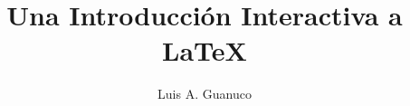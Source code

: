 \newenvironment{exampletwoup}
  {\VerbatimEnvironment
   \begin{VerbatimOut}{example.out}}
  {\end{VerbatimOut}
   \setlength{\parindent}{0pt}
   \fbox{\begin{tabular}{l|l}
   \begin{minipage}{0.55\linewidth}
     \inputminted[fontsize=\small,resetmargins]{latex}{example.out}
   \end{minipage} &
   \begin{minipage}{0.35\linewidth}
     
   \end{minipage}
   \end{tabular}}}

\newenvironment{exampletwouptiny}
  {\VerbatimEnvironment
   \begin{VerbatimOut}{example.out}}
  {\end{VerbatimOut}
   \setlength{\parindent}{0pt}
   \fbox{\begin{tabular}{l|l}
   \begin{minipage}{0.55\linewidth}
     \inputminted[fontsize=\scriptsize,resetmargins]{latex}{example.out}
   \end{minipage} &
   \begin{minipage}{0.35\linewidth}
     \setlength{\parskip}{6pt plus 1pt minus 1pt}%
     \raggedright\scriptsize
   \end{minipage}
   \end{tabular}}}

\newenvironment{exampletwouptinynoframe}
  {\VerbatimEnvironment
   \begin{VerbatimOut}{example.out}}
  {\end{VerbatimOut}
   \setlength{\parindent}{0pt}
   \begin{tabular}{l|l}
   \begin{minipage}{0.55\linewidth}
     \inputminted[fontsize=\scriptsize,resetmargins]{latex}{example.out}
   \end{minipage} &
   \begin{minipage}{0.35\linewidth}
     \setlength{\parskip}{6pt plus 1pt minus 1pt}%
     \raggedright\scriptsize
   \end{minipage}
   \end{tabular}}

\title{Una Introducción Interactiva a \LaTeX}
\author{Luis A. Guanuco}
